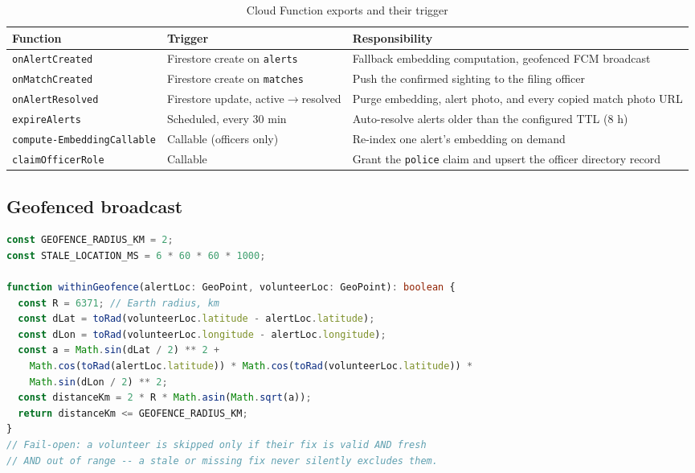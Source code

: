 \documentclass[12pt,a4paper,oneside]{report}
\newcommand{\code}[1]{\texttt{#1}}
\begin{document}
\begin{table}[H]
\centering
\caption{Cloud Function exports and their trigger}
\label{tab:functions}
\begin{tabular}{|>{\raggedright\arraybackslash}p{4.3cm}|>{\raggedright\arraybackslash}p{2.6cm}|p{6.3cm}|}
\hline
\textbf{Function} & \textbf{Trigger} & \textbf{Responsibility} \\
\hline
\code{onAlertCreated} & Firestore create on \code{alerts} & Fallback embedding computation, geofenced FCM broadcast \\ \hline
\code{onMatchCreated} & Firestore create on \code{matches} & Push the confirmed sighting to the filing officer \\ \hline
\code{onAlertResolved} & Firestore update, active$\to$resolved & Purge embedding, alert photo, and every copied match photo URL \\ \hline
\code{expireAlerts} & Scheduled, every 30 min & Auto-resolve alerts older than the configured TTL (8 h) \\ \hline
\code{compute-}\linebreak\code{EmbeddingCallable} & Callable (officers only) & Re-index one alert's embedding on demand \\ \hline
\code{claimOfficerRole} & Callable & Grant the \code{police} claim and upsert the officer directory record \\
\hline
\end{tabular}
\end{table}

\subsection*{Geofenced broadcast}
\begin{lstlisting}[language=TypeScript, caption={Haversine geofence filter -- excerpt of \texttt{functions/src/notify.ts}}]
const GEOFENCE_RADIUS_KM = 2;
const STALE_LOCATION_MS = 6 * 60 * 60 * 1000;

function withinGeofence(alertLoc: GeoPoint, volunteerLoc: GeoPoint): boolean {
  const R = 6371; // Earth radius, km
  const dLat = toRad(volunteerLoc.latitude - alertLoc.latitude);
  const dLon = toRad(volunteerLoc.longitude - alertLoc.longitude);
  const a = Math.sin(dLat / 2) ** 2 +
    Math.cos(toRad(alertLoc.latitude)) * Math.cos(toRad(volunteerLoc.latitude)) *
    Math.sin(dLon / 2) ** 2;
  const distanceKm = 2 * R * Math.asin(Math.sqrt(a));
  return distanceKm <= GEOFENCE_RADIUS_KM;
}
// Fail-open: a volunteer is skipped only if their fix is valid AND fresh
// AND out of range -- a stale or missing fix never silently excludes them.
\end{lstlisting}
\end{document}
